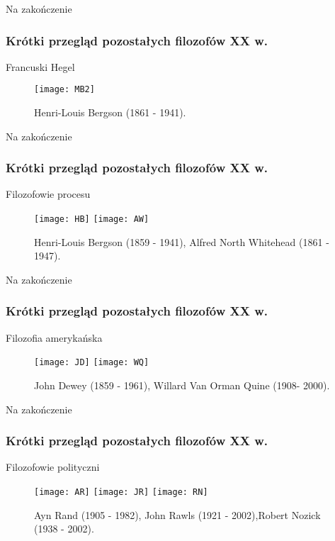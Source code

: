 \begin{frame}{Na zakończenie}
\frametitle{Krótki przegląd pozostałych filozofów XX w.}
\begin{block}{Francuski Hegel}
\begin{figure}
\centering
\texttt{[image: MB2]}
\caption{Henri-Louis Bergson (1861 - 1941).}
\end{figure}
\end{block}
\end{frame}

\begin{frame}{Na zakończenie}
\frametitle{Krótki przegląd pozostałych filozofów XX w.}
\begin{block}{Filozofowie procesu}
\begin{figure}
\centering
\texttt{[image: HB]}
\texttt{[image: AW]}
\caption{Henri-Louis Bergson (1859 - 1941), Alfred North Whitehead (1861 - 1947).}
\end{figure}
\end{block}
\end{frame}

\begin{frame}{Na zakończenie}
\frametitle{Krótki przegląd pozostałych filozofów XX w.}
\begin{block}{Filozofia amerykańska}
\begin{figure}
\centering
\texttt{[image: JD]}
\texttt{[image: WQ]}
\caption{John Dewey (1859 - 1961), Willard Van Orman Quine (1908\linebreak - 2000).}
\end{figure}
\end{block}
\end{frame}

\begin{frame}{Na zakończenie}
\frametitle{Krótki przegląd pozostałych filozofów XX w.}
\begin{block}{Filozofowie polityczni}
\begin{figure}
\centering
\texttt{[image: AR]}
\texttt{[image: JR]}
\texttt{[image: RN]}
\caption{Ayn Rand  (1905 - 1982), John Rawls (1921 - 2002),\linebreak Robert Nozick (1938 - 2002).}
\end{figure}
\end{block}

\end{frame}

